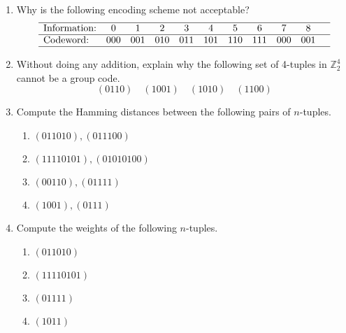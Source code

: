 {\small
\begin{enumerate}
 
 
\item
Why is the following encoding scheme not acceptable?
\[
\begin{array}{lcccccccccc}
\hline
\mbox{Information:} & 0 & 1 & 2 & 3 & 4 & 5 & 6 & 7 & 8 &
\\ \hline
\mbox{Codeword:} & 000 & 001 & 010 & 011 & 101 & 110
& 111 & 000 & 001 \\ \hline
\end{array}
\]
 
 
\item
Without doing any addition, explain why the following set of 4-tuples in
${\mathbb Z}_2^4$ cannot be a group code. 
\[
(0110) \quad (1001) \quad (1010) \quad (1100)
\]
 
 
\item    %
Compute the Hamming distances between the following pairs of
$n$-tuples. 
\begin{multicols}{2}
\begin{enumerate}

\item
$(011010), (011100)$

\item
$(11110101), (01010100)$

\item
$(00110), (01111)$

\item
$(1001), (0111)$

\end{enumerate}
\end{multicols}


 
\item
Compute the weights of the following $n$-tuples.
\begin{multicols}{2}
\begin{enumerate}

\item
$(011010)$

\item
$(11110101)$

\item
$(01111)$

\item
$(1011)$

\end{enumerate}
\end{multicols}

 
 

\end{enumerate}}
